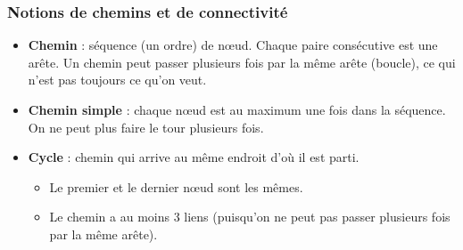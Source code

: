 \subsubsection{Notions de chemins et de connectivité}
\begin{itemize}

\item \textbf{Chemin} : séquence (un ordre) de nœud. Chaque paire consécutive est une arête. Un chemin peut passer plusieurs fois par la même arête (boucle), ce qui n'est pas toujours ce qu'on veut.
\item \textbf{Chemin simple} : chaque nœud est au maximum une fois dans la séquence. On ne peut plus faire le tour plusieurs fois.
\item \textbf{Cycle} : chemin qui arrive au même endroit d'où il est parti. 
	\begin{itemize}
			
	\item Le premier et le dernier nœud sont les mêmes. 
	\item Le chemin a au moins 3 liens (puisqu'on ne peut pas passer plusieurs fois par la même 	arête). 

\end{itemize}
\end{itemize}